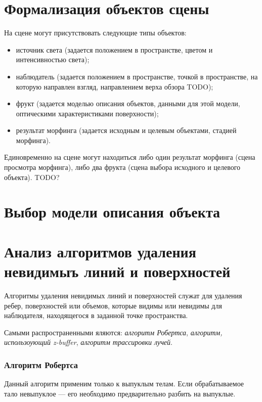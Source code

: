    \section{Формализация объектов сцены}
    На сцене могут присутствовать следующие типы объектов:
    \begin{itemize}
    	\item источник света (задается положением в пространстве, цветом и интенсивностью света);
    	\item наблюдатель (задается положением в пространстве, точкой в пространстве, на которую направлен взгляд, направлением верха обзора TODO);
    	\item фрукт (задается моделью описания объектов, данными для этой модели, оптическими характеристиками поверхности);
    	\item результат морфинга (задается исходным и целевым объектами, стадией морфинга). 
    \end{itemize}
    
    Единовременно на сцене могут находиться либо один результат морфинга (сцена просмотра морфинга), либо два фрукта (сцена выбора исходного и целевого объекта). TODO?
    
    \section{Выбор модели описания объекта}
    
    
    
    \section{Анализ алгоритмов удаления невидимыъ линий и поверхностей}
    
    Алгоритмы удаления невидимых линий и поверхностей служат для удаления ребер, поверхностей или объемов, которые видимы или невидимы для наблюдателя, находящегося в заданной точке пространства\cite{rogers}.
    
    Самыми распространенными яляются: \textit{алгоритм Робертса}, \textit{алгоритм, использоующий z-buffer}, \textit{алгоритм трассировки лучей}.
    
   \subsubsection{Алгоритм Робертса}
   
   Данный алгоритм применим только к выпуклым телам. Если обрабатываемое тало невыпуклое --- его необходимо предварительно разбить на выпуклые.
   
